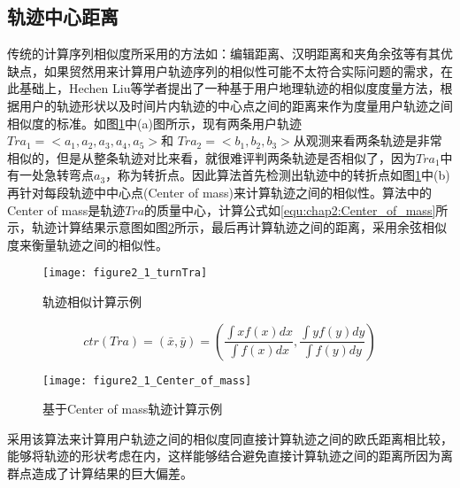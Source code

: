 \subsection{轨迹中心距离}
传统的计算序列相似度所采用的方法如：编辑距离、汉明距离和夹角余弦等有其优缺点，如果贸然用来计算用户轨迹序列的相似性可能不太符合实际问题的需求，在此基础上，Hechen Liu等学者提出了一种基于用户地理轨迹的相似度度量方法，根据用户的轨迹形状以及时间片内轨迹的中心点之间的距离来作为度量用户轨迹之间相似度的标准。如图\ref{fig:2_3_turn}中(a)图所示，现有两条用户轨迹$Tra_{1}=<a_{1},a_{2},a_{3},a_{4},a_{5}>$和
$Tra_{2}=<b_{1},b_{2},b_{3}>$从观测来看两条轨迹是非常相似的，但是从整条轨迹对比来看，就很难评判两条轨迹是否相似了，因为$Tra_{1}$中有一处急转弯点$a_{3}$，称为转折点。因此算法首先检测出轨迹中的转折点如图\ref{fig:2_3_turn}中(b)再针对每段轨迹中中心点(Center of mass)来计算轨迹之间的相似性。算法中的Center of mass是轨迹$Tra$的质量中心，计算公式如\ref{equ:chap2:Center_of_mass}所示，轨迹计算结果示意图如图\ref{fig:2_3_Center_of_mass}所示，最后再计算轨迹之间的距离，采用余弦相似度来衡量轨迹之间的相似性。
\begin{figure}[htp]
\centering
\texttt{[image: figure2\_1\_turnTra]}
\caption{轨迹相似计算示例}
\label{fig:2_3_turn}
\end{figure}
\begin{equation}
\label{equ:chap2:Center_of_mass}
ctr(Tra)=(\bar{x},\bar{y})=(  \frac{\int x f(x)dx  }{\int f(x)dx},\frac{\int y f(y)dy  }{\int f(y)dy} )
\end{equation}
\begin{figure}[htp]
\centering
\texttt{[image: figure2\_1\_Center\_of\_mass]}
\caption{基于Center of mass轨迹计算示例}
\label{fig:2_3_Center_of_mass}
\end{figure}
\par 采用该算法来计算用户轨迹之间的相似度同直接计算轨迹之间的欧氏距离相比较，能够将轨迹的形状考虑在内，这样能够结合避免直接计算轨迹之间的距离所因为离群点造成了计算结果的巨大偏差。

